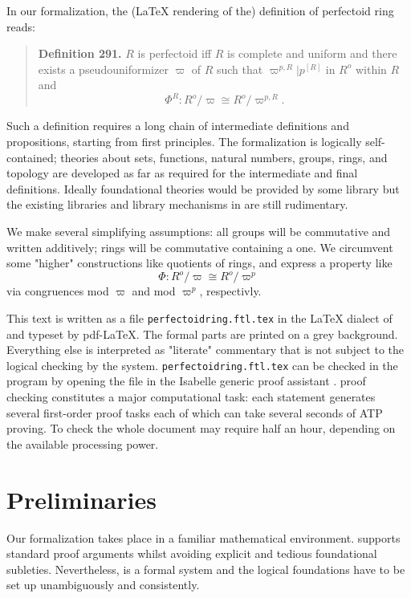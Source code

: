 \documentclass[english,11pt]{article}
\begin{document}
In our formalization, the (\LaTeX{} rendering of the) definition of perfectoid ring reads:
%
\begin{quote}
{\bf Definition 291.}
$R$ is perfectoid iff $R$ is complete and uniform and there
exists a pseudouniformizer $\varpi$ of $R$ such that    
$\varpi^{p,R} | p^{[R]}$ in $R^o$ within $R$
and 
$$\Phi^{R} : R^o / \varpi \cong R^o / \varpi^{p,R}.$$
\end{quote}

Such a definition requires a long chain of intermediate definitions
and propositions, starting from first principles.
The formalization is logically self-contained; theories 
about sets, functions, natural numbers, groups, rings, and topology are
developed as far as required for the intermediate and final definitions. 
Ideally foundational theories would be provided by some library
but the existing libraries and library mechanisms in \Naproche{} 
are still rudimentary.

We make
several simplifying assumptions:
all groups will be commutative and written additively;
rings will be commutative containing a one.
We circumvent some "higher" constructions like quotients of rings,
and express a property like
$$\Phi : R^o / \varpi \cong R^o / \varpi^{p}$$
via congruences mod $\varpi$ and mod $\varpi^{p}$, respectivly.


This text is written as a file 
\texttt{perfectoidring.ftl.tex}
in the \LaTeX{} dialect of \Naproche{} and
typeset by pdf-\LaTeX. The formal parts are printed on a grey background. 
Everything else
is interpreted as "literate" commentary that is not subject to the 
logical checking by the system.
\texttt{perfectoidring.ftl.tex}
can be checked in the \Naproche{} program by opening the file in the Isabelle generic 
proof assistant
\cite{Isabelle}.
\Naproche{} proof checking constitutes a major computational task: each statement generates several
first-order proof tasks each of which can take several seconds of
ATP proving. To check the whole document may require half an hour, 
depending on the available processing power.

\part{Preliminaries}

Our formalization takes place in a familiar mathematical environment. 
\Naproche{} supports standard proof arguments whilst avoiding explicit and tedious foundational
subleties. Nevertheless, \Naproche{} is a formal system and the logical foundations
have to be set up unambiguously and consistently.
\end{document}
